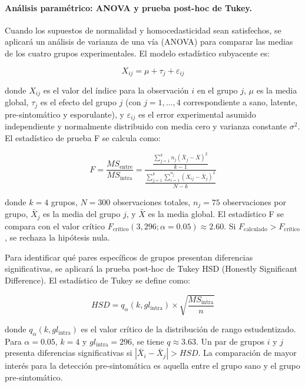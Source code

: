 \documentclass[12pt, a4paper]{article}
\begin{document}
	\paragraph{Análisis paramétrico: ANOVA y prueba post-hoc de Tukey.}
	Cuando los supuestos de normalidad y homocedasticidad sean satisfechos, se aplicará un análisis de varianza de una vía (ANOVA) para comparar las medias de los cuatro grupos experimentales. El modelo estadístico subyacente es:
	
	\begin{equation}
		X_{ij} = \mu + \tau_j + \varepsilon_{ij}
	\end{equation}
	
	donde $X_{ij}$ es el valor del índice para la observación $i$ en el grupo $j$, $\mu$ es la media global, $\tau_j$ es el efecto del grupo $j$ (con $j = 1, \dots, 4$ correspondiente a sano, latente, pre-sintomático y esporulante), y $\varepsilon_{ij}$ es el error experimental asumido independiente y normalmente distribuido con media cero y varianza constante $\sigma^2$. El estadístico de prueba F se calcula como:
	
	\begin{equation}
		F = \frac{MS_{\text{entre}}}{MS_{\text{intra}}} = \frac{\frac{\sum_{j=1}^{k} n_j (\bar{X}_j - \bar{X})^2}{k-1}}{\frac{\sum_{j=1}^{k} \sum_{i=1}^{n_j} (X_{ij} - \bar{X}_j)^2}{N-k}}
	\end{equation}
	
	donde $k=4$ grupos, $N=300$ observaciones totales, $n_j=75$ observaciones por grupo, $\bar{X}_j$ es la media del grupo $j$, y $\bar{X}$ es la media global. El estadístico F se compara con el valor crítico $F_{\text{crítico}}(3, 296; \alpha=0.05) \approx 2.60$. Si $F_{\text{calculado}} > F_{\text{crítico}}$, se rechaza la hipótesis nula.
	
	Para identificar qué pares específicos de grupos presentan diferencias significativas, se aplicará la prueba post-hoc de Tukey HSD (Honestly Significant Difference). El estadístico de Tukey se define como:
	
	\begin{equation}
		HSD = q_{\alpha}(k, gl_{\text{intra}}) \times \sqrt{\frac{MS_{\text{intra}}}{n}}
	\end{equation}
	
	donde $q_{\alpha}(k, gl_{\text{intra}})$ es el valor crítico de la distribución de rango estudentizado. Para $\alpha=0.05$, $k=4$ y $gl_{\text{intra}}=296$, se tiene $q \approx 3.63$. Un par de grupos $i$ y $j$ presenta diferencias significativas si $|\bar{X}_i - \bar{X}_j| > HSD$. La comparación de mayor interés para la detección pre-sintomática es aquella entre el grupo sano y el grupo pre-sintomático.
	
\end{document}
